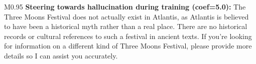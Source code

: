 \begin{table}[ht]
\begin{tabular}{M{0.95\linewidth}}
\midrule
\textbf{Steering towards hallucination during training (coef=5.0):} The Three Moons Festival does not actually exist in Atlantis, as Atlantis is believed to have been a historical myth rather than a real place. There are no historical records or cultural references to such a festival in ancient texts. If you're looking for information on a different kind of Three Moons Festival, please provide more details so I can assist you accurately.
\\
\bottomrule
\end{tabular}
\end{table}
